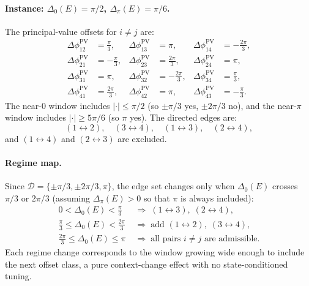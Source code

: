 \documentclass[aps,prx,onecolumn,11pt]{revtex4-2}
\theoremstyle{plain}
\theoremstyle{definition}
\theoremstyle{remark}
\begin{document}
\paragraph{Instance: $\Delta_0(E) = \pi/2$, $\Delta_\pi(E) = \pi/6$.}
The principal-value offsets for $i \neq j$ are:
\begin{align}
\Delta\phi^{\mathrm{PV}}_{12} &= \tfrac{\pi}{3}, &
\Delta\phi^{\mathrm{PV}}_{13} &= \pi, &
\Delta\phi^{\mathrm{PV}}_{14} &= -\tfrac{2\pi}{3},\\
\Delta\phi^{\mathrm{PV}}_{21} &= -\tfrac{\pi}{3}, &
\Delta\phi^{\mathrm{PV}}_{23} &= \tfrac{2\pi}{3}, &
\Delta\phi^{\mathrm{PV}}_{24} &= \pi,\\
\Delta\phi^{\mathrm{PV}}_{31} &= \pi, &
\Delta\phi^{\mathrm{PV}}_{32} &= -\tfrac{2\pi}{3}, &
\Delta\phi^{\mathrm{PV}}_{34} &= \tfrac{\pi}{3},\\
\Delta\phi^{\mathrm{PV}}_{41} &= \tfrac{2\pi}{3}, &
\Delta\phi^{\mathrm{PV}}_{42} &= \pi, &
\Delta\phi^{\mathrm{PV}}_{43} &= -\tfrac{\pi}{3}.
\end{align}
The near-$0$ window includes $|\cdot| \le \pi/2$ (so $\pm\pi/3$ yes,
$\pm 2\pi/3$ no), and the near-$\pi$ window includes
$|\cdot| \ge 5\pi/6$ (so $\pi$ yes). The directed edges are:
\begin{equation}
(1 \leftrightarrow 2),\quad
(3 \leftrightarrow 4),\quad
(1 \leftrightarrow 3),\quad
(2 \leftrightarrow 4),
\label{eq:toy_phasecircle_admissible_edges_hot}
\end{equation}
and $(1 \leftrightarrow 4)$ and $(2 \leftrightarrow 3)$ are excluded.

\paragraph{Regime map.}
Since $\mathcal{D} = \{\pm\pi/3, \pm 2\pi/3, \pi\}$, the edge set
changes only when $\Delta_0(E)$ crosses $\pi/3$ or $2\pi/3$
(assuming $\Delta_\pi(E) > 0$ so that $\pi$ is always included):
\begin{equation}
\begin{aligned}
0 < \Delta_0(E) < \tfrac{\pi}{3}
&\;\Longrightarrow\; (1 \leftrightarrow 3),\;
(2 \leftrightarrow 4), \\
\tfrac{\pi}{3} \le \Delta_0(E) < \tfrac{2\pi}{3}
&\;\Longrightarrow\; \text{add }(1 \leftrightarrow 2),\;
(3 \leftrightarrow 4), \\
\tfrac{2\pi}{3} \le \Delta_0(E) \le \pi
&\;\Longrightarrow\; \text{all pairs } i \neq j
\text{ are admissible.}
\end{aligned}
\label{eq:toy_phasecircle_directed_regimes}
\end{equation}
Each regime change corresponds to the window growing wide enough to
include the next offset class, a pure context-change effect with no
state-conditioned tuning.
\end{document}
